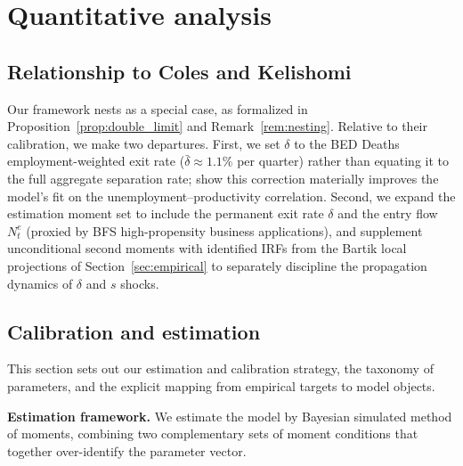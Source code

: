 \documentclass[authoryear, review, 12pt]{elsarticle}
\begin{document}
	\section{Quantitative analysis}\label{sec:quantitative}
	\subsection{Relationship to Coles and Kelishomi}\label{sec:ck_comparison}

	Our framework nests \citet{coles_2018} as a special case, as formalized in
	Proposition~\ref{prop:double_limit} and Remark~\ref{rem:nesting}. Relative to their calibration, we make two
	departures. First, we set $\delta$ to the BED Deaths employment-weighted exit rate
	($\bar\delta \approx 1.1\%$ per quarter) rather than equating it to the full
	aggregate separation rate; \citet{gabrovski_2025} show this correction materially
	improves the model's fit on the unemployment--productivity correlation. Second, we
	expand the estimation moment set to include the permanent exit rate $\delta$ and
	the entry flow $N^e_t$ (proxied by BFS high-propensity business applications), and supplement unconditional second moments with
	identified IRFs from the Bartik local projections of Section~\ref{sec:empirical}
	to separately discipline the propagation dynamics of $\delta$ and $s$ shocks.

	\subsection{Calibration and estimation}\label{sec:calib}

	This section sets out our estimation and calibration strategy, the taxonomy of
	parameters, and the explicit mapping from empirical targets to model objects.

	\medskip\noindent\textbf{Estimation framework.}
	We estimate the model by Bayesian simulated method of moments, combining two
	complementary sets of moment conditions that together over-identify the parameter
	vector.
\end{document}
